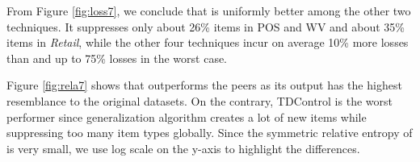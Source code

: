 
From Figure \ref{fig:loss7},
we conclude that \psrule is uniformly better among the other two techniques.
It suppresses only about 26\% items in POS and WV and about 35\% items in
{\em Retail}, while the other four techniques incur on average 10\% more losses
than \psrule and up to 75\% losses in the worst case.


Figure \ref{fig:rela7} shows that \psdist outperforms the peers
 as its output has the highest resemblance
to the original datasets. On the contrary, TDControl is the worst performer
since generalization algorithm creates a lot of new items while suppressing
too many item types globally. Since the symmetric relative entropy of \psdist
is very small, we use log scale on the y-axis to highlight the differences.


